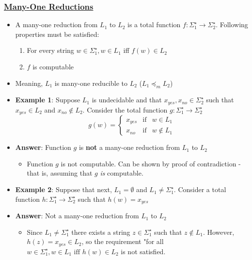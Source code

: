 \documentclass[8pt]{extarticle}
\begin{document}
\subsubsection*{\underline{Many-One Reductions}}
\begin{itemize}
    \item A many-one reduction from $L_1$ to $L_2$ is a total function $f:\Sigma_1^\star\rightarrow
    \Sigma_2^\star$. Following properties must be satisfied:
    \begin{enumerate}
        \item For every string $w\in\Sigma_1^\star,w\in L_1$ iff $f(w)\in L_2$
        \item $f$ is computable
    \end{enumerate}
    \item Meaning, $L_1$ is many-one reducible to $L_2$ ($L_1\preceq_m L_2$)
    \item \textbf{Example 1}: Suppose $L_1$ is undecidable and that $x_{yes},x_{no}\in\Sigma_2^\star$ such 
    that $x_{yes}\in L_2$ and $x_{no}\notin L_2$. Consider the total function $g:\Sigma_1^\star\rightarrow
    \Sigma_2^\star$ 
    $$g(w)= \left\{ \begin{array}{rcl}
        x_{yes} & \mbox{if} & w\in L_1 \\
        x_{no} & \mbox{if} & w\notin L_1
    \end{array}\right.$$
    \item \textbf{Answer}: Function $g$ is \textbf{not} a many-one reduction from $L_1$ to $L_2$
    \begin{itemize}
        \item Function $g$ is not computable. Can be shown by proof of contradiction - that is, 
        assuming that $g$ \textit{is} computable.
    \end{itemize}
    \item \textbf{Example 2}: Suppose that next, $L_1=\emptyset$ and $L_1\neq\Sigma_1^\star$. 
    Consider a total function $h:\Sigma_1^\star\rightarrow\Sigma_2^\star$ such that $h(w)=x_{yes}$
    \item \textbf{Answer}: Not a many-one reduction from $L_1$ to $L_2$
    \begin{itemize}
        \item Since $L_1\neq\Sigma_1^\star$ there exists a string $z\in\Sigma_1^\star$ such that 
        $z\notin L_1$. However, $h(z)=x_{yes}\in L_2$, so the requirement "for all $w\in\Sigma_1^\star,
        w\in L_1\text{ iff } h(w)\in L_2$ is not satisfied. 
    \end{itemize}
\end{itemize}
\end{document}
